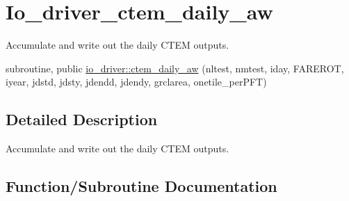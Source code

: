 \hypertarget{group__io__driver__ctem__daily__aw}{}\section{Io\+\_\+driver\+\_\+ctem\+\_\+daily\+\_\+aw}
\label{group__io__driver__ctem__daily__aw}


Accumulate and write out the daily C\+T\+E\+M outputs.  


\begin{DoxyCompactItemize}
\item 
subroutine, public \hyperlink{group__io__driver__ctem__daily__aw_ga2bf58d7f6363b0469ee120bd8090de6f}{io\+\_\+driver\+::ctem\+\_\+daily\+\_\+aw} (nltest, nmtest, iday, F\+A\+R\+E\+R\+O\+T, iyear, jdstd, jdsty, jdendd, jdendy, grclarea, onetile\+\_\+per\+P\+F\+T)
\end{DoxyCompactItemize}


\subsection{Detailed Description}
Accumulate and write out the daily C\+T\+E\+M outputs. 



\subsection{Function/\+Subroutine Documentation}
\hypertarget{group__io__driver__ctem__daily__aw_ga2bf58d7f6363b0469ee120bd8090de6f}{}
